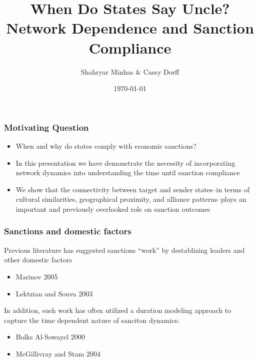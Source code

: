 \documentclass{beamer}
\title[When Do States Say Uncle?]{When Do States Say Uncle? Network Dependence and Sanction Compliance}
\author[Minhas \& Dorff]{Shahryar Minhas \& Cassy Dorff}
\institute[Duke University]
{
{\emph{shahryar.minhas@duke.edu \& cassy.dorff@duke.edu}} \\
\medskip
Duke University 
}
\date{\today}
\begin{document}
\begin{frame}
\titlepage
\end{frame}

\begin{frame}
\frametitle{Motivating Question}

\begin{itemize}
	\item When and why do states comply with economic sanctions? 
	\item In this presentation we have demonstrate the necessity of incorporating network dynamics into understanding the time until sanction compliance
	\item We show that the connectivity between target and sender states--in terms of cultural similarities, geographical proximity, and alliance patterns--plays an important and previously overlooked role on sanction outcomes
\end{itemize}

\end{frame}

\begin{frame}
\frametitle{Sanctions and domestic factors}
Previous literature has suggested sanctions ``work'' by destablizing leaders and other domestic factors
\begin{itemize}
\item Marinov 2005
\item Lektzian and Souva 2003
\end{itemize}

In addition, such work has often utilized a duration modeling approach to capture the time dependent nature of sanciton dynamics: 
\begin{itemize}
\item Bolks Al-Sowayel 2000
\item McGillivray and Stam 2004
\end{itemize}


\end{frame}
\end{document}
